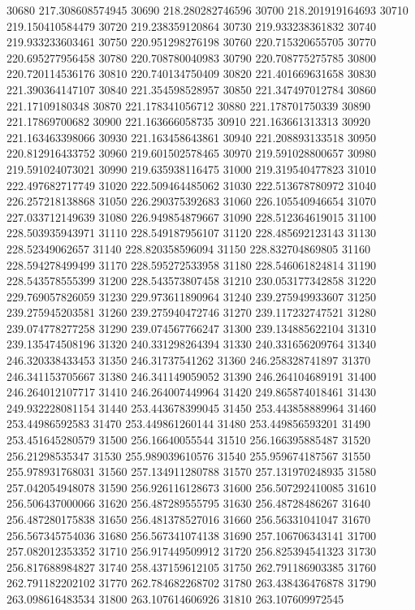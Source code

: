 {30680 217.308608574945
30690 218.280282746596
30700 218.201919164693
30710 219.150410584479
30720 219.238359120864
30730 219.933238361832
30740 219.933233603461
30750 220.951298276198
30760 220.715320655705
30770 220.695277956458
30780 220.708780040983
30790 220.708775275785
30800 220.720114536176
30810 220.740134750409
30820 221.401669631658
30830 221.390364147107
30840 221.354598528957
30850 221.347497012784
30860 221.17109180348
30870 221.178341056712
30880 221.178701750339
30890 221.17869700682
30900 221.163666058735
30910 221.163661313313
30920 221.163463398066
30930 221.163458643861
30940 221.208893133518
30950 220.812916433752
30960 219.601502578465
30970 219.591028800657
30980 219.591024073021
30990 219.635938116475
31000 219.319540477823
31010 222.497682717749
31020 222.509464485062
31030 222.513678780972
31040 226.257218138868
31050 226.290375392683
31060 226.105540946654
31070 227.033712149639
31080 226.949854879667
31090 228.512364619015
31100 228.503935943971
31110 228.549187956107
31120 228.485692123143
31130 228.52349062657
31140 228.820358596094
31150 228.832704869805
31160 228.594278499499
31170 228.595272533958
31180 228.546061824814
31190 228.543578555399
31200 228.543573807458
31210 230.053177342858
31220 229.769057826059
31230 229.973611890964
31240 239.275949933607
31250 239.275945203581
31260 239.275940472746
31270 239.117232747521
31280 239.074778277258
31290 239.074567766247
31300 239.134885622104
31310 239.135474508196
31320 240.331298264394
31330 240.331656209764
31340 246.320338433453
31350 246.31737541262
31360 246.258328741897
31370 246.341153705667
31380 246.341149059052
31390 246.264104689191
31400 246.264012107717
31410 246.264007449964
31420 249.865874018461
31430 249.932228081154
31440 253.443678399045
31450 253.443858889964
31460 253.44986592583
31470 253.449861260144
31480 253.449856593201
31490 253.451645280579
31500 256.16640055544
31510 256.166395885487
31520 256.21298535347
31530 255.989039610576
31540 255.959674187567
31550 255.978931768031
31560 257.134911280788
31570 257.131970248935
31580 257.042054948078
31590 256.926116128673
31600 256.507292410085
31610 256.506437000066
31620 256.487289555795
31630 256.48728486267
31640 256.487280175838
31650 256.481378527016
31660 256.56331041047
31670 256.567345754036
31680 256.567341074138
31690 257.106706343141
31700 257.082012353352
31710 256.917449509912
31720 256.825394541323
31730 256.817688984827
31740 258.437159612105
31750 262.791186903385
31760 262.791182202102
31770 262.784682268702
31780 263.438436476878
31790 263.098616483534
31800 263.107614606926
31810 263.107609972545
}
